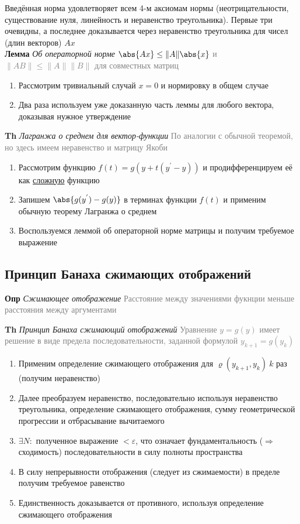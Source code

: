 Введённая норма удовлетворяет всем 4-м аксиомам нормы (неотрицательности, существование нуля, линейность и
неравенство треугольника).
Первые три очевидны, а последнее доказывается через неравенство треугольника для чисел (длин векторов) $Ax$ \\

\textbf{Лемма} \textit{Об операторной норме}
\textcolor{gray}{$\abs{Ax} \leq \|A\| \abs{x}$ и $\|AB\| \leq \|A\| \|B\|$ для совместных матриц}

\begin{enumerate}
    \item Рассмотрим тривиальный случай $x = 0$ и нормировку в общем случае
    \item Два раза используем уже доказанную часть леммы для любого вектора, доказывая нужное утверждение
\end{enumerate}

\textbf{Th} \textit{Лагранжа о среднем для вектор-функции}
\textcolor{gray}{По аналогии с обычной теоремой, но здесь имеем неравенство и матрицу Якоби}

\begin{enumerate}
    \item Рассмотрим функцию $f(t) = g(y + t(y^{'} - y))$ и продифференцируем её как \underline{сложную} функцию
    \item Запишем $\abs{g(y^{'}) - g(y)}$ в терминах функции $f(t)$ и применим обычную теорему Лагранжа о среднем
    \item Воспользуемся леммой об операторной норме матрицы и получим требуемое выражение
\end{enumerate}

\subsection{Принцип Банаха сжимающих отображений}

\textbf{Опр} \textit{Сжимающее отображение}
\textcolor{gray}{Расстояние между значениями фукнции меньше расстояния между аргументами}

\textbf{Th} \textit{Принцип Банаха сжимающий отображений}
\textcolor{gray}{Уравнение $y = g(y)$ имеет решение в виде предела последовательности, заданной формулой $y_{k+1} = g
(y_k)$}

\begin{enumerate}
    \item Применим определение сжимающего отображения для $\varrho(y_{k+1},y_k)~k$ раз (получим неравенство)
    \item Далее преобразуем неравенство, последовательно используя неравенство треугольника, определение сжимающего
    отображения, сумму геометрической прогрессии и отбрасывание вычитаемого
    \item $\exists N:$ полученное выражение $< \varepsilon $, что означает фундаментальность ($\Rightarrow$
    сходимость) последовательности в силу полноты пространства
    \item В силу непрерывности отображения (следует из сжимаемости) в пределе получим требуемое равенство
    \item Единственность доказывается от противного, используя определение сжимающего отображения
\end{enumerate}

